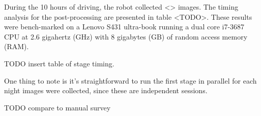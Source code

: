 During the 10 hours of driving, the robot collected <> images.  The timing analysis for the post-processing are presented in table <TODO>. These results were bench-marked on a Lenovo S431 ultra-book running a dual core i7-3687 CPU at 2.6 gigahertz (GHz) with 8 gigabytes (GB) of random access memory (RAM).  

TODO insert table of stage timing.

One thing to note is it's straightforward to run the first stage in parallel for each night images were collected, since these are independent sessions.

TODO compare to manual survey
